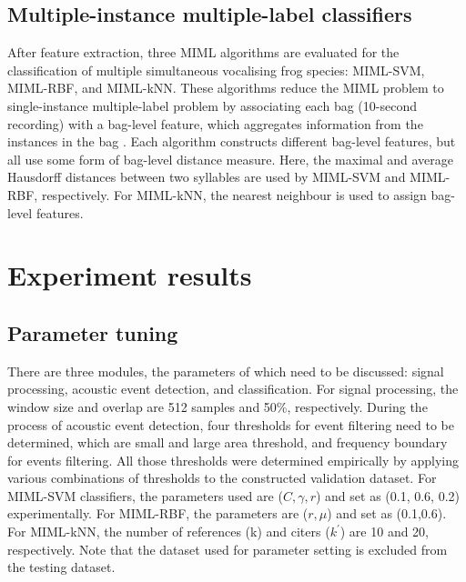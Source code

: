 \subsection{Multiple-instance multiple-label classifiers}
After feature extraction, three MIML algorithms are evaluated for the classification of multiple simultaneous vocalising frog species: MIML-SVM, MIML-RBF, and MIML-kNN. 
These algorithms reduce the MIML problem to single-instance multiple-label problem by associating each bag (10-second recording) with a bag-level feature, which aggregates information from the instances in the bag  \citep{briggs2012acoustic}. Each algorithm constructs different bag-level features, but all use some form of bag-level distance measure. Here, the maximal and average Hausdorff distances between two syllables are used by MIML-SVM and MIML-RBF, respectively. For MIML-kNN, the nearest neighbour is used to assign bag-level features. 


\section{Experiment results}

\subsection{Parameter tuning}
There are three modules, the parameters of which need to be discussed: signal processing, acoustic event detection, and classification. For signal processing, the window size and overlap are 512 samples and 50\%, respectively. During the process of acoustic event detection, four thresholds for event filtering need to be determined, which are small and large area threshold, and frequency boundary for events filtering. All those thresholds were determined empirically by applying various combinations of thresholds to the constructed validation dataset. For MIML-SVM classifiers, the parameters used are ($C,\gamma,r$) and set as (0.1, 0.6, 0.2) experimentally. For MIML-RBF, the parameters are ($ r, \mu$) and set as (0.1,0.6). For MIML-kNN, the number of references (k) and citers ($k^{'}$) are 10 and 20, respectively. Note that the dataset used for parameter setting is excluded from the testing dataset.
 


